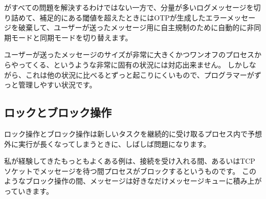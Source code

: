がすべての問題を解決するわけではない一方で、分量が多いログメッセージを切り詰めて、補足的にある閾値を超えたときにはOTPが生成したエラーメッセージを破棄して、ユーザーが送ったメッセージ用に自主規制のために自動的に非同期モードと同期モードを切り替えます。

ユーザーが送ったメッセージのサイズが非常に大きくかつワンオフのプロセスからやってくる、というような非常に固有の状況には対応出来ません。
しかしながら、これは他の状況に比べるとずっと起こりにくいもので、プログラマーがずっと管理しやすい状況です。

\subsection{ロックとブロック操作}

ロック操作とブロック操作は新しいタスクを継続的に受け取るプロセス内で予想外に実行が長くなってしまうときに、しばしば問題になります。

私が経験してきたもっともよくある例は、接続を受け入れる間、あるいはTCPソケットでメッセージを待つ間プロセスがブロックするというものです。
このようなブロック操作の間、メッセージは好きなだけメッセージキューに積み上がっていきます。

